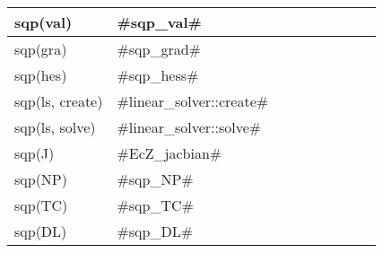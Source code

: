 \begin{center}
\begin{tabular}{|l*{8}{|l}}
    sqp(val) & #sqp_val# \\ \hline
    sqp(gra) & #sqp_grad# \\ \hline
    sqp(hes) & #sqp_hess# \\ \hline
    sqp(ls, create) & #linear_solver::create# \\ \hline
    sqp(ls, solve) & #linear_solver::solve# \\ \hline
    sqp(J) & #EcZ_jacbian# \\ \hline    
    sqp(NP) & #sqp_NP# \\ \hline    
    sqp(TC) & #sqp_TC# \\ \hline    
    sqp(DL) & #sqp_DL# \\ \hline    
  \end{tabular}
\end{center}